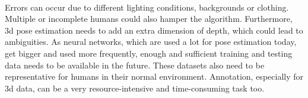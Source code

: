 \\ 
Errors can occur due to different lighting conditions, backgrounds or clothing. 
Multiple or incomplete humans could also hamper the algorithm. Furthermore, 3d pose estimation needs to add an extra dimension of depth, which could lead to ambiguities. As neural networks, which are used a lot for pose estimation today, get bigger and used more frequently, enough and sufficient training and testing data needs to be available in the future. These datasets also need to be representative for humans in their normal environment. Annotation, especially for 3d data, can be a very resource-intensive and time-consuming task too.
